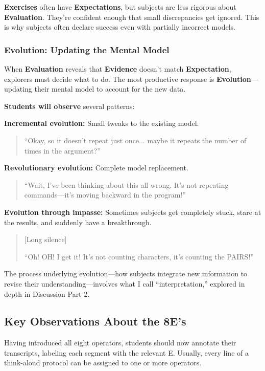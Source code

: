 \documentclass[12pt,letterpaper]{article}
\begin{document}
\textbf{Exercises} often have \textbf{Expectations}, but subjects are less rigorous about \textbf{Evaluation}. They're confident enough that small discrepancies get ignored. This is why subjects often declare success even with partially incorrect models.

\subsubsection{Evolution: Updating the Mental Model}

When \textbf{Evaluation} reveals that \textbf{Evidence} doesn't match \textbf{Expectation}, explorers must decide what to do. The most productive response is \textbf{Evolution}—updating their mental model to account for the new data.

\textbf{Students will observe} several patterns:

\textbf{Incremental evolution:} Small tweaks to the existing model.
\begin{quote}
``Okay, so it doesn't repeat just once... maybe it repeats the number of times in the argument?''
\end{quote}

\textbf{Revolutionary evolution:} Complete model replacement.
\begin{quote}
``Wait, I've been thinking about this all wrong. It's not repeating commands—it's moving backward in the program!''
\end{quote}

\textbf{Evolution through impasse:} Sometimes subjects get completely stuck, stare at the results, and suddenly have a breakthrough.
\begin{quote}
[Long silence]

``Oh! OH! I get it! It's not counting characters, it's counting the PAIRS!''
\end{quote}

The process underlying evolution—how subjects integrate new information to revise their understanding—involves what I call ``interpretation,'' explored in depth in Discussion Part 2.

\subsection{Key Observations About the 8E's}

Having introduced all eight operators, students should now annotate their transcripts, labeling each segment with the relevant E. Usually, every line of a think-aloud protocol can be assigned to one or more operators.
\end{document}
